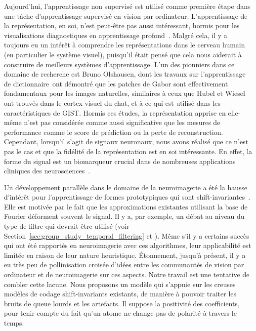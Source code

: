 Aujourd'hui, l'apprentissage non supervisé est utilisé comme première étape dans une tâche d'apprentissage supervisé en vision par ordinateur. L'apprentissage de la représentation, en soi, n'est peut-être pas aussi intéressant, hormis pour les visualisations diagnostiques en apprentissage profond~\citep{zeiler2014visualizing}. Malgré cela, il y a toujours eu un intérêt à comprendre les représentations dans le cerveau humain (en particulier le système visuel), puisqu’il était pensé que cela nous aiderait à construire de meilleurs systèmes d'apprentissage. L'un des pionniers dans ce domaine de recherche est Bruno Olshausen, dont les travaux sur l'apprentissage de dictionnaire~\citep{olshausen1996emergence}ont démontré que les patches de Gabor sont effectivement fondamentaux pour les images naturelles, similaires à ceux que Hubel et Wiesel~\citep{hubel1962receptive, marcelja1980mathematical} ont trouvés dans le cortex visuel du chat, et à ce qui est utilisé dans les caractéristiques de GIST. Hormis ces études, la représentation apprise en elle-même n'est pas considérée comme aussi significative que les mesures de performance comme le score de prédiction ou la perte de reconstruction. Cependant, lorsqu’il s’agit de signaux neuronaux, nous avons réalisé que ce n'est pas le cas et que la fidélité de la représentation est en soi intéressante. En effet, la forme du signal est un biomarqueur crucial dans de nombreuses applications cliniques des neurosciences~\citep{cole2017brain}. 

Un développement parallèle dans le domaine de la neuroimagerie a été la hausse d’intérêt pour l'apprentissage de formes prototypiques qui sont shift-invariantes~\citep{jost2006motif, barthelemy2013multivariate, brockmeier2016learning, hitziger2017adaptive}. Elle est motivée par le fait que les approximations existantes utilisant la base de Fourier déforment souvent le signal. Il y a, par exemple, un débat au niveau du type de filtre qui devrait être utilisé (voir Section~\ref{sec:group_study_temporal_filtering} et \cite{widmann2015digital,parks1987digital,ifeachor2002digital, gotz-etal:15}). 
Même s’il y a certains succès qui ont été rapportés en neuroimagerie avec ces algorithmes, leur applicabilité est limitée en raison de leur nature heuristique. Étonnement, jusqu'à présent, il y a eu très peu de pollinisation croisée d'idées entre les communautés de vision par ordinateur et de neuroimagerie sur ces aspects. Notre travail est une tentative de combler cette lacune. Nous proposons un modèle qui s'appuie sur les creuses modèles de codage shift-invariants existants, de manière à pouvoir traiter les bruits de queue lourds et les artefacts. Il suppose la positivité des coefficients, pour tenir compte du fait qu'un atome ne change pas de polarité à travers le temps.

